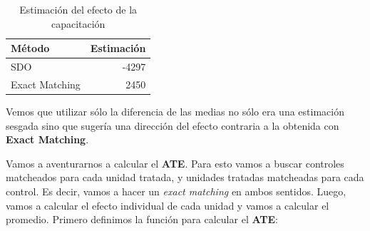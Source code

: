 \documentclass[
  letterpaper,
  DIV=11,
  numbers=noendperiod,
  oneside]{scrreprt}
\begin{document}
\begin{table}
\caption*{
{\large Estimación del efecto de la capacitación}
} 
\fontsize{12.0pt}{14.4pt}\selectfont
\begin{tabular*}{\linewidth}{@{\extracolsep{\fill}}lr}
\toprule
Método & Estimación \\ 
\midrule\addlinespace[2.5pt]
SDO & -4297 \\ 
Exact Matching & 2450 \\ 
\bottomrule
\end{tabular*}
\end{table}

Vemos que utilizar sólo la diferencia de las medias no sólo era una
estimación sesgada sino que sugería una dirección del efecto contraria a
la obtenida con \textbf{Exact Matching}.

Vamos a aventurarnos a calcular el \textbf{ATE}. Para esto vamos a
buscar controles matcheados para cada unidad tratada, y unidades
tratadas matcheadas para cada control. Es decir, vamos a hacer un
\emph{exact matching} en ambos sentidos. Luego, vamos a calcular el
efecto individual de cada unidad y vamos a calcular el
promedio. Primero definimos la función para calcular el
\textbf{ATE}:
\end{document}
